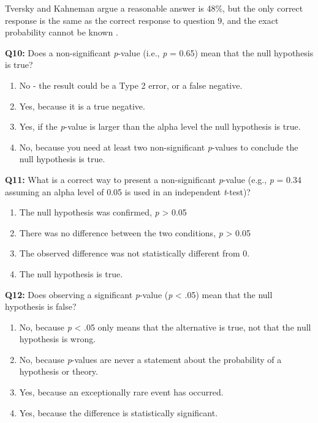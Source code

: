 \documentclass[
  oneside]{krantz}
\providecommand{\tightlist}{%
  \setlength{\itemsep}{0pt}\setlength{\parskip}{0pt}}
\begin{document}
Tversky and Kahneman argue a reasonable answer is 48\%, but the only correct response is the same as the correct response to question 9, and the exact probability cannot be known \citep{miller_what_2009}.

\textbf{Q10:} Does a non-significant \emph{p}-value (i.e., \emph{p} = 0.65) mean that the null hypothesis is true?

\begin{enumerate}
\def\labelenumi{\Alph{enumi})}
\tightlist
\item
  No - the result could be a Type 2 error, or a false negative.
\item
  Yes, because it is a true negative.
\item
  Yes, if the \emph{p}-value is larger than the alpha level the null hypothesis is true.
\item
  No, because you need at least two non-significant \emph{p}-values to conclude the null hypothesis is true.
\end{enumerate}

\textbf{Q11:} What is a correct way to present a non-significant \emph{p}-value (e.g., \emph{p} = 0.34 assuming an alpha level of 0.05 is used in an independent \emph{t}-test)?

\begin{enumerate}
\def\labelenumi{\Alph{enumi})}
\tightlist
\item
  The null hypothesis was confirmed, \emph{p} \textgreater{} 0.05
\item
  There was no difference between the two conditions, \emph{p} \textgreater{} 0.05
\item
  The observed difference was not statistically different from 0.
\item
  The null hypothesis is true.
\end{enumerate}

\textbf{Q12:} Does observing a significant \emph{p}-value (\emph{p} \textless{} .05) mean that the null hypothesis is false?

\begin{enumerate}
\def\labelenumi{\Alph{enumi})}
\tightlist
\item
  No, because \emph{p} \textless{} .05 only means that the alternative is true, not that the null hypothesis is wrong.
\item
  No, because \emph{p}-values are never a statement about the probability of a hypothesis or theory.
\item
  Yes, because an exceptionally rare event has occurred.
\item
  Yes, because the difference is statistically significant.
\end{enumerate}
\end{document}
